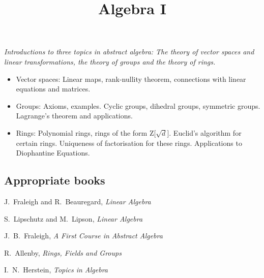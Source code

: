 \documentclass[twoside]{scrartcl}
\title{Algebra I}
\begin{document}
{


{\Large\bfseries{}}

\textit{Introductions to three topics in abstract algebra: The theory of vector spaces and linear
transformations, the theory of groups and the theory of rings.}


\begin{itemize}
\item Vector spaces: Linear maps, rank-nullity theorem, connections with linear equations and matrices.

\item Groups: Axioms, examples. Cyclic groups, dihedral groups, symmetric groups. Lagrange’s  theorem and applications.

\item Rings: Polynomial rings, rings of the form Z[$\sqrt{d}$]. Euclid’s algorithm for certain rings. Uniqueness of factorisation for these rings. Applications to Diophantine Equations.
\end{itemize}

\subsection*{Appropriate books}

{\shortskip
J.~Fraleigh and R.~Beauregard, \emph{Linear Algebra}

S.~Lipschutz and M.~Lipson, \emph{Linear Algebra}

J.~B.~Fraleigh, \emph{A First Course in Abstract Algebra}

R.~Allenby, \emph{Rings, Fields and Groups}

I.~N.~Herstein, \emph{Topics in Algebra}
}}

\TableofContents

%
\end{document}
